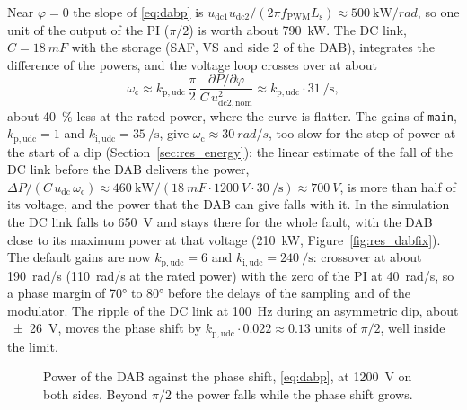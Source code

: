 \documentclass[11pt,a4paper]{scrartcl}
\newcommand{\ped}[1]{_{\mathrm{#1}}}
\newcommand{\code}[1]{\texttt{#1}}
\begin{document}
\begin{onehalfspace}
Near $\varphi = 0$ the slope of \eqref{eq:dabp} is $u\ped{dc1}u\ped{dc2}/(2\pi f\ped{PWM} L\ped{s}) \approx \SI{500}{\kilo\watt\per rad}$, so one unit of the output of the PI ($\pi/2$) is worth about \SI{790}{\kilo\watt}. The DC link, $C = \SI{18}{mF}$ with the storage (SAF, VS and side 2 of the DAB), integrates the difference of the powers, and the voltage loop crosses over at about
\begin{equation}
	\omega\ped{c} \approx k\ped{p,udc}\,\frac{\pi}{2}\,\frac{\partial P/\partial\varphi}{C\,u\ped{dc2,nom}^2} \approx k\ped{p,udc} \cdot \SI{31}{\per\second},
	\label{eq:dabwc}
\end{equation}
about \SI{40}{\percent} less at the rated power, where the curve is flatter.
The gains of \code{main}, $k\ped{p,udc} = 1$ and $k\ped{i,udc} = \SI{35}{\per\second}$, give $\omega\ped{c} \approx \SI{30}{rad/s}$, too slow for the step of power at the start of a dip (Section~\ref{sec:res_energy}): the linear estimate of the fall of the DC link before the DAB delivers the power, $\Delta P/(C\,u\ped{dc}\,\omega\ped{c}) \approx \SI{460}{\kilo\watt}/(\SI{18}{mF} \cdot \SI{1200}{V} \cdot \SI{30}{\per\second}) \approx \SI{700}{V}$, is more than half of its voltage, and the power that the DAB can give falls with it. In the simulation the DC link falls to \SI{650}{V} and stays there for the whole fault, with the DAB close to its maximum power at that voltage (\SI{210}{\kilo\watt}, Figure~\ref{fig:res_dabfix}). The default gains are now $k\ped{p,udc} = 6$ and $k\ped{i,udc} = \SI{240}{\per\second}$: crossover at about \SI{190}{rad/s} (\SI{110}{rad/s} at the rated power) with the zero of the PI at \SI{40}{rad/s}, so a phase margin of \ang{70} to \ang{80} before the delays of the sampling and of the modulator. The ripple of the DC link at \SI{100}{Hz} during an asymmetric dip, about \SI{\pm 26}{V}, moves the phase shift by $k\ped{p,udc} \cdot 0.022 \approx 0.13$ units of $\pi/2$, well inside the limit.

\begin{figure}[H]
	\centering
	\caption{Power of the DAB against the phase shift, \eqref{eq:dabp}, at \SI{1200}{V} on both sides. Beyond $\pi/2$ the power falls while the phase shift grows.}
	\label{fig:dabp}
\end{figure}


\end{onehalfspace}
\end{document}
